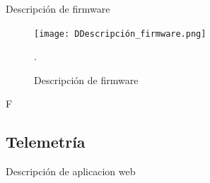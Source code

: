 \documentclass[journal]{IEEEtran}
\begin{document}
Descripción de firmware 


\begin{figure}[!h]
	\centering
	\texttt{[image: DDescripción\_firmware.png]}
	\caption{Descripción de firmware}.
	\label{estructura_general}
\end{figure}



{\color{blue}F}


\subsection{Telemetría}
Descripción de aplicacion web
\newline








\end{document}
